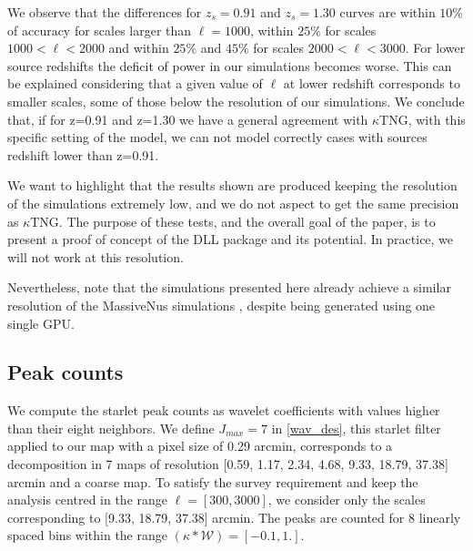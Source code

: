 \documentclass[twocolumn,twocolappendix]{aastex63}
\begin{document}
We observe that the differences for $z_s=0.91$ and  $z_s=1.30$ curves are within $10\%$ of accuracy for scales larger than $\ell=1000$, within $25\%$  for scales $1000<\ell<2000$ and  within $25\%$ and $45\%$ for scales $2000<\ell<3000$. For lower source redshifts the deficit of power in our simulations becomes worse. This can be explained considering that a given value of $\ell$ at lower redshift corresponds to smaller scales, some of those below the resolution of our simulations. We conclude that, if for z=0.91 and z=1.30 we have a general agreement with $\kappa$TNG, with this specific setting of the model, we can not model correctly cases with sources redshift lower than z=0.91.


 We want to highlight that the results shown are produced keeping the resolution of the simulations extremely low, and we do not aspect to get the same precision as $\kappa$TNG. The purpose of these tests, and the overall goal of the paper, is to present a proof of concept of the DLL package and its potential.  In practice, we will not work at this resolution. 

Nevertheless, note that the simulations presented here already achieve a similar resolution of the MassiveNus simulations \citep{liu2018massivenus}, despite being generated using one single GPU. 


\subsection{Peak counts}\label{peak_sec}
We compute the starlet peak counts as wavelet coefficients with values higher than their eight neighbors. 
We define $J_{max}=7$ in \autoref{wav_des}, this starlet filter applied to our map with a pixel size of 0.29 arcmin, corresponds to a decomposition in 7 maps of resolution [0.59, 1.17, 2.34, 4.68, 9.33, 18.79, 37.38] arcmin and a coarse map. To satisfy the survey requirement and keep the analysis centred in the range $\ell=[300, 3000]$, we consider only the scales corresponding to [9.33, 18.79, 37.38] arcmin. The peaks are counted for 8 linearly spaced bins within the range $(\kappa*\mathcal{W})=[-0.1, 1.]$. 
\end{document}
